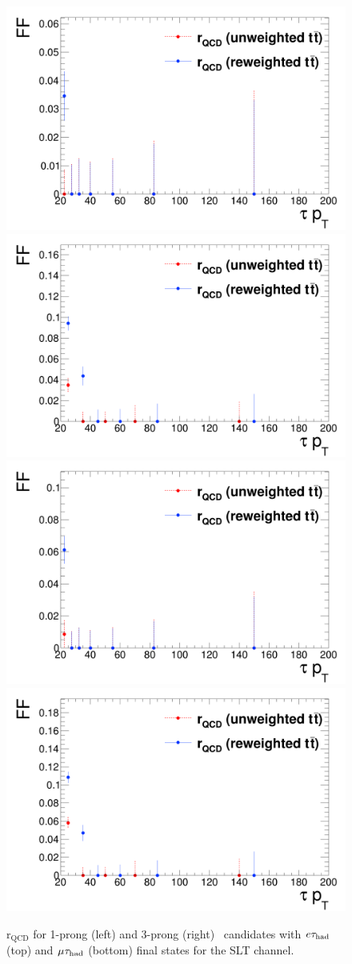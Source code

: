 \begin{figure}[htbp]
\centering
\includegraphics[width=.4\textwidth]{DiHiggs/plots/FF_CRs/SLTElecrQCD1p.png}
\includegraphics[width=.4\textwidth]{DiHiggs/plots/FF_CRs/SLTElecrQCD3p.png} \\
\includegraphics[width=.4\textwidth]{DiHiggs/plots/FF_CRs/SLTMuonrQCD1p.png}
\includegraphics[width=.4\textwidth]{DiHiggs/plots/FF_CRs/SLTMuonrQCD3p.png}\\
\caption{$\mathrm{r}_{\mathrm{QCD}}$ for 1-prong (left) 
and 3-prong (right) \tauhad\ candidates with $e\tau_{\mathrm{had}}$ 
 (top) and $\mu\tau_{\mathrm{had}}$ (bottom) final states
for the SLT channel.}
\label{fig:SLT_rQCD}
\end{figure}

